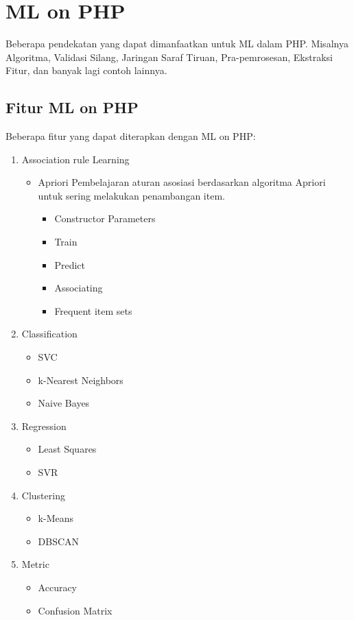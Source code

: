 \section{ML on PHP}
\par Beberapa pendekatan yang dapat dimanfaatkan  untuk ML dalam PHP. Misalnya Algoritma, Validasi Silang, Jaringan Saraf Tiruan, Pra-pemrosesan, Ekstraksi Fitur, dan banyak lagi contoh lainnya.

\subsection{Fitur ML on PHP}
Beberapa fitur yang dapat diterapkan dengan ML on PHP:
\begin{enumerate}
\item Association rule Learning
\begin{itemize}
\item Apriori
Pembelajaran aturan asosiasi berdasarkan algoritma Apriori untuk sering melakukan penambangan item.
\begin{itemize}
	\item Constructor Parameters
	\item Train
	\item Predict
	\item Associating
	\item Frequent item sets
\end{itemize}
\end{itemize}
\item Classification
\begin{itemize}
\item SVC
\item k-Nearest Neighbors
\item Naive Bayes
\end{itemize}
\item Regression
\begin{itemize}
\item Least Squares
\item SVR
\end{itemize}
\item Clustering
\begin{itemize}
\item k-Means
\item DBSCAN
\end{itemize}
\item Metric
\begin{itemize}
\item Accuracy
\item Confusion Matrix

\end{itemize}
\end{enumerate}
